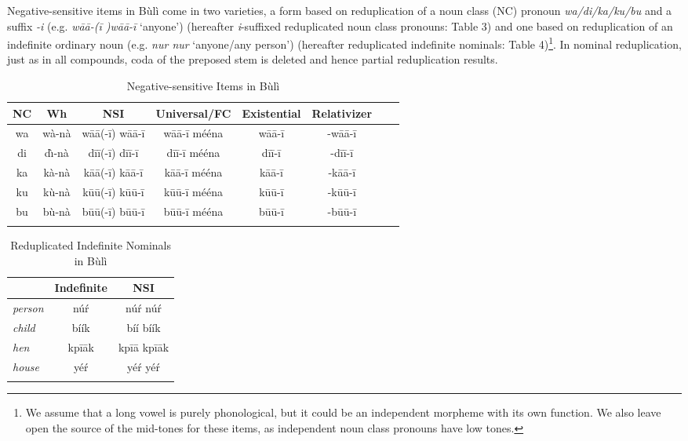 \documentclass[output=paper,colorlinks,citecolor=brown]{langscibook}
\begin{document}
Negative-sensitive items in Bùlì come in two varieties, a form based on reduplication of a noun class (NC) pronoun\textit{ wa/di/ka/ku/bu} and a suffix \textit{-i} (e.g. \textit{wāā-(ī )wāā-ī} `anyone') (hereafter \textit{i}-suffixed reduplicated noun class pronouns: Table 3) and one based on reduplication of an indefinite ordinary noun (e.g. \textit{nur nur} `anyone/any person') (hereafter reduplicated indefinite nominals: Table 4)\footnote{We assume that a long vowel is purely phonological, but it could be an independent morpheme with its own function. We also leave open the source of the mid-tones for these items, as independent noun class pronouns have low tones.}. In nominal reduplication, just as in all compounds, coda of the preposed stem is deleted and hence partial reduplication results.

\begin{table}
  \begin{tabular}{cccccccc}
\lspbottomrule
NC  &  Wh  &  NSI  &  Universal/FC & Existential & Relativizer    \\
  \midrule
wa & wà-nà &   wāā(-ī) wāā-ī &    wāā-ī mééna & wāā-ī & -wāā-ī  \\
di &  d\`{\i}-nà & dīī(-ī)  dīī-ī &  dīī-ī mééna & dīī-ī & -dīī-ī    \\
ka &  kà-nà &  kāā(-ī)  kāā-ī  & kāā-ī mééna &  kāā-ī & -kāā-ī   \\
ku &  kù-nà &  k\=u\=u(-ī)  k\=u\=u-ī  & k\=u\=u-ī mééna & k\=u\=u-ī & -k\=u\=u-ī  \\
bu &  bù-nà &  b\=u\=u(-ī)  b\=u\=u-ī  &  b\=u\=u-ī mééna  & b\=u\=u-ī &  -b\=u\=u-ī \\
\lspbottomrule
  \end{tabular}
  \caption{Negative-sensitive Items in Bùlì}
\end{table}
\begin{table}
  \begin{tabular}{lcc}
\lspbottomrule
  & Indefinite   & NSI     \\
  \midrule
\textit{person} & n\'u\'r &  n\'u\'r n\'u\'r \\
\textit{child} &  bíík &  bíí bíík \\
\textit{hen} &  kpīāk &  kpīā kpīāk \\
\textit{house} &  yé\'r &  yé\'r yé\'r \\
\lspbottomrule
  \end{tabular}
  \caption{Reduplicated Indefinite Nominals in Bùlì}
\end{table}
\end{document}
